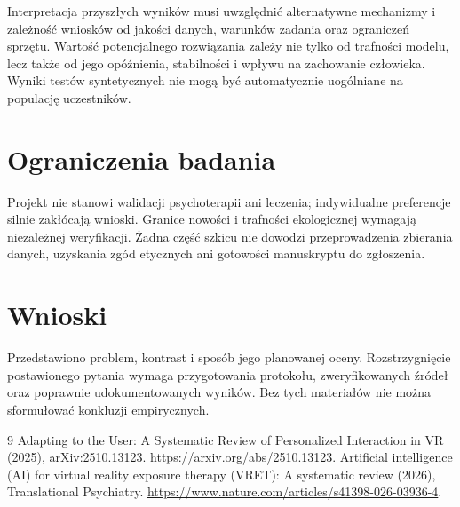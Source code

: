 \documentclass[11pt,a4paper]{article}
\begin{document}
Interpretacja przyszłych wyników musi uwzględnić alternatywne mechanizmy i zależność wniosków od jakości danych, warunków zadania oraz ograniczeń sprzętu. Wartość potencjalnego rozwiązania zależy nie tylko od trafności modelu, lecz także od jego opóźnienia, stabilności i wpływu na zachowanie człowieka. Wyniki testów syntetycznych nie mogą być automatycznie uogólniane na populację uczestników.

\section{Ograniczenia badania}

Projekt nie stanowi walidacji psychoterapii ani leczenia; indywidualne preferencje silnie zakłócają wnioski. Granice nowości i trafności ekologicznej wymagają niezależnej weryfikacji. Żadna część szkicu nie dowodzi przeprowadzenia zbierania danych, uzyskania zgód etycznych ani gotowości manuskryptu do zgłoszenia.

\section{Wnioski}

Przedstawiono problem, kontrast i sposób jego planowanej oceny. Rozstrzygnięcie postawionego pytania wymaga przygotowania protokołu, zweryfikowanych źródeł oraz poprawnie udokumentowanych wyników. Bez tych materiałów nie można sformułować konkluzji empirycznych.

\begin{thebibliography}{9}
 Adapting to the User: A Systematic Review of Personalized Interaction in VR (2025), arXiv:2510.13123. \url{https://arxiv.org/abs/2510.13123}.
 Artificial intelligence (AI) for virtual reality exposure therapy (VRET): A systematic review (2026), Translational Psychiatry. \url{https://www.nature.com/articles/s41398-026-03936-4}.
\end{thebibliography}
\end{document}
